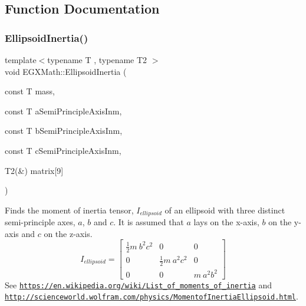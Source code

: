 \subsection{Function Documentation}
\mbox{\label{group___e_g_x_math-_geometry-3_d-_ellipsoid-_inertia_ga3b6f641f06037be75b8f51822eaa71bf}} 
\subsubsection{\texorpdfstring{Ellipsoid\+Inertia()}{EllipsoidInertia()}\hspace{0.1cm}{\footnotesize\ttfamily [1/3]}}
{\footnotesize\ttfamily template$<$typename T , typename T2 $>$ \\
void E\+G\+X\+Math\+::\+Ellipsoid\+Inertia (\begin{DoxyParamCaption}\item[{const T}]{mass,  }\item[{const T}]{a\+Semi\+Principle\+Axis\+Inm,  }\item[{const T}]{b\+Semi\+Principle\+Axis\+Inm,  }\item[{const T}]{c\+Semi\+Principle\+Axis\+Inm,  }\item[{T2(\&)}]{matrix\mbox{[}9\mbox{]} }\end{DoxyParamCaption})}



Finds the moment of inertia tensor, $I_{ellipsoid}$ of an ellipsoid with three distinct semi-\/principle axes, $a$, $b$ and $c$. It is assumed that $a$ lays on the x-\/axis, $b$ on the y-\/axis and $c$ on the z-\/axis. \[ I_{ellipsoid}=\begin{bmatrix} \frac{1}{2}m\ b^2c^2 & 0 & 0\\ 0 & \frac{1}{2}m\ a^2c^2 & 0\\ 0 & 0 & m\ a^2b^2 \end{bmatrix} \] See \href{https://en.wikipedia.org/wiki/List_of_moments_of_inertia}{\tt https\+://en.\+wikipedia.\+org/wiki/\+List\+\_\+of\+\_\+moments\+\_\+of\+\_\+inertia} and \href{http://scienceworld.wolfram.com/physics/MomentofInertiaEllipsoid.html}{\tt http\+://scienceworld.\+wolfram.\+com/physics/\+Momentof\+Inertia\+Ellipsoid.\+html}. 



